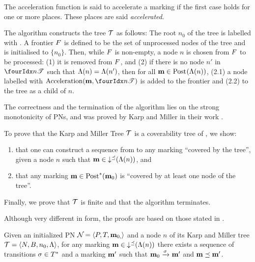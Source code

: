 The acceleration function is said to accelerate a marking if the first case holds for one or more places.
These places are said \emph{accelerated}.


The algorithm constructs the tree $\mathcal{T}$ as follows:
The root $n_0$ of the tree is labelled with \mari.
A frontier $F$ is defined to be the set of unprocessed nodes of the tree and is initialised to $\{n_0\}$.
Then, while $F$ is non-empty, a node $n$ is chosen from $F$ to be processed:
(1) it is removed from $F$, and (2) if there is no node $n'$ in $\treepath{n}$ such that $\operatorname{\Lambda}(n) = \operatorname{\Lambda}(n')$, then for all \omark $\mathbf{m} \in \operatorname{Post}_{}(\operatorname{\Lambda}(n))$, (2.1) a node labelled with $\kmacc{\mar, \treepath{n}}$ is added to the frontier and (2.2) to the tree as a child of $n$.

The correctness and the termination of the algorithm lies on the strong monotonicity of \acp{PN}, and was proved by Karp and Miller in their work \cite{Karp69}.

To prove that the Karp and Miller Tree $\mathcal{T}$ is a coverability tree of \namePN, we show:
\begin{enumerate}
  \item that one can construct a sequence from \mari to any marking \mar “covered by the tree”, given a node $n$ such that $\mathbf{m} \in \operatorname{\downarrow^\preceq}(\operatorname{\Lambda}(n))$, and
  \item \todo{} that any marking $\mathbf{m} \in \operatorname{Post}^*_{}(\mathbf{m}_0)$ is “covered by at least one node of the tree”.
\end{enumerate}

\todo{} Finally, we prove that $\mathcal{T}$ is finite and that the algorithm terminates.

Although very different in form, the proofs are based on those stated in \cite{Karp69}.

\begin{lemm}
  Given an initialized \ac{PN} $\mathcal{N}_{} = \left\langle P_{}, T_{}, \mathbf{m}_{0,}\right\rangle$ and a node $n$ of its Karp and Miller tree $\mathcal{T} = \left\langle N, B, n_0, \operatorname{\Lambda}\right\rangle$,
  for any marking $\mathbf{m} \in \operatorname{\downarrow^\preceq}(\operatorname{\Lambda}(n))$ there exists a sequence of transitions $\seqt \in \transitions^*$ and a marking $\mathbf{m}'$ such that $\mari \fire{\seqt} \mar'$ and $\mathbf{m} \preceq \mathbf{m}'$.
\end{lemm}

